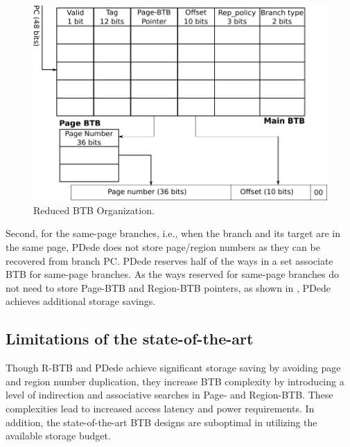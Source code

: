 \begin{figure}
\centering
\includegraphics[width=.9\columnwidth, trim=0 0 0 0, clip]{figures/fig_9a_no_pcshift.pdf}
\caption{Reduced BTB Organization.}
\label{fig:rbtb}
\end{figure}

Second, for the same-page branches, i.e., when the branch and its target are in the same page, PDede does not store page/region numbers as they can be recovered from branch PC. PDede reserves half of the ways in a set associate BTB for same-page branches. As the ways reserved for same-page branches do not need to store Page-BTB and Region-BTB pointers, as shown in , PDede achieves additional storage savings.

\subsection{Limitations of the state-of-the-art} Though R-BTB and PDede achieve significant storage saving by avoiding page and region number duplication, they increase BTB complexity by introducing a level of indirection and associative searches in Page- and Region-BTB. These complexities lead to increased access latency and power requirements. In addition, the state-of-the-art BTB designs are suboptimal in utilizing the available storage budget.


